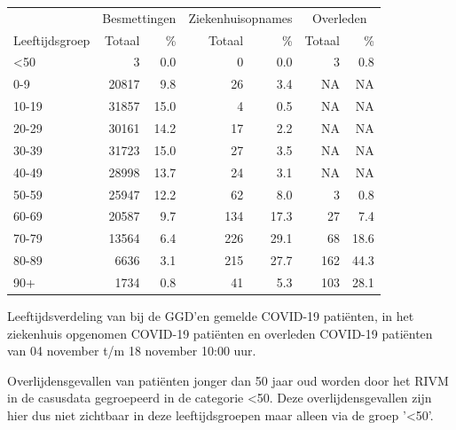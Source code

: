 \documentclass[
  english,
  man,floatsintext]{apa6}
\begin{document}
\begin{table}
\centering\begingroup\fontsize{11}{13}\selectfont

\begin{threeparttable}
\begin{tabular}{lrrrrrr}
\toprule
\multicolumn{1}{c}{ } & \multicolumn{2}{c}{Besmettingen} & \multicolumn{2}{c}{Ziekenhuisopnames} & \multicolumn{2}{c}{Overleden} \\
\cmidrule(l{3pt}r{3pt}){2-3} \cmidrule(l{3pt}r{3pt}){4-5} \cmidrule(l{3pt}r{3pt}){6-7}
Leeftijdsgroep & Totaal & \% & Totaal & \% & Totaal & \%\\
\midrule
<50 & 3 & 0.0 & 0 & 0.0 & 3 & 0.8\\
0-9 & 20817 & 9.8 & 26 & 3.4 & NA & NA\\
10-19 & 31857 & 15.0 & 4 & 0.5 & NA & NA\\
20-29 & 30161 & 14.2 & 17 & 2.2 & NA & NA\\
30-39 & 31723 & 15.0 & 27 & 3.5 & NA & NA\\
40-49 & 28998 & 13.7 & 24 & 3.1 & NA & NA\\
50-59 & 25947 & 12.2 & 62 & 8.0 & 3 & 0.8\\
60-69 & 20587 & 9.7 & 134 & 17.3 & 27 & 7.4\\
70-79 & 13564 & 6.4 & 226 & 29.1 & 68 & 18.6\\
80-89 & 6636 & 3.1 & 215 & 27.7 & 162 & 44.3\\
90+ & 1734 & 0.8 & 41 & 5.3 & 103 & 28.1\\
\bottomrule
\end{tabular}
\begin{tablenotes}
\item[1] Leeftijdsverdeling van bij de GGD’en gemelde COVID-19 patiënten, in het ziekenhuis opgenomen COVID-19 patiënten en overleden COVID-19 patiënten van 04 november t/m 18 november 10:00 uur.
\item[2] Overlijdensgevallen van patiënten jonger dan 50 jaar oud worden door het RIVM in de casusdata gegroepeerd in de categorie <50. Deze overlijdensgevallen zijn hier dus niet zichtbaar in deze leeftijdsgroepen maar alleen via de groep '<50'.
\end{tablenotes}
\end{threeparttable}
\endgroup{}
\end{table}

\newpage
\end{document}

